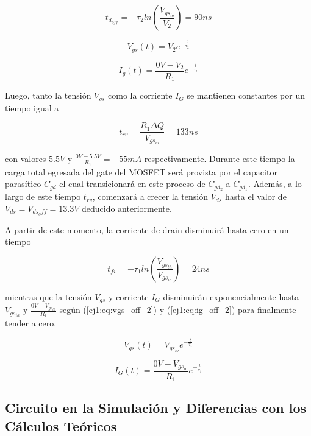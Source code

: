 \begin{equation}
t_{d_{off}} = -\tau_2 ln(\frac{V_{gs_{io}}}{V_2}) = 90ns
\label{ej1:eq:toff}
\end{equation}

\begin{equation}
V_{gs}(t) = V_2e^{-\frac{t}{\tau_2}}
\label{ej1:eq:vgs_off_1}
\end{equation}

\begin{equation}
I_{g}(t) = \frac{0V-V_2}{R_1} e^{-\frac{t}{\tau_2}}
\label{ej1:eq:ig_off_1}
\end{equation}

Luego, tanto la tensión $V_{gs}$ como la corriente $I_G$ se mantienen constantes por un tiempo igual a 

\begin{equation}
t_{rv} = \frac{R_1 \Delta Q}{V_{gs_{io}}} = 133ns
\label{ej1:eq:trv}
\end{equation}

con valores $5.5V$ y $\frac{0V-5.5V}{R_1} = -55mA$ respectivamente. Durante este tiempo la carga total egresada del gate del MOSFET será provista por el capacitor parasítico $C_{gd}$ el cual transicionará en este proceso de $C_{gd_2}$ a $C_{gd_1}$. Además, a lo largo de este tiempo $t_{rv}$, comenzará a crecer la tensión $V_{ds}$ hasta el valor de $V_{ds} = V_{ds_off} = 13.3V$ deducido anteriormente.

A partir de este momento, la corriente de drain disminuirá hasta cero en un tiempo

\begin{equation}
t_{fi} = -\tau_1 ln\left( \frac{V_{gs_{th}}}{V_{gs_{io}}} \right) = 24ns
\label{ej1:eq:tfi}
\end{equation}

mientras que la tensión $V_{gs}$ y corriente $I_G$ disminuirán exponencialmente hasta $V_{gs_{th}}$ y $\frac{0V-V_{gs_{th}}}{R_1}$ según (\ref{ej1:eq:vgs_off_2}) y (\ref{ej1:eq:ig_off_2}) para finalmente tender a cero.

\begin{equation}
V_{gs}(t) = V_{gs_{io}} e^{-\frac{t}{\tau_1}}
\label{ej1:eq:vgs_off_2}
\end{equation}

\begin{equation}
I_{G}(t) = \frac{0V-V_{gs_{io}}}{R_1} e^{-\frac{t}{\tau_1}}
\label{ej1:eq:ig_off_2}
\end{equation}

\subsection{Circuito en la Simulación y Diferencias con los Cálculos Teóricos}

